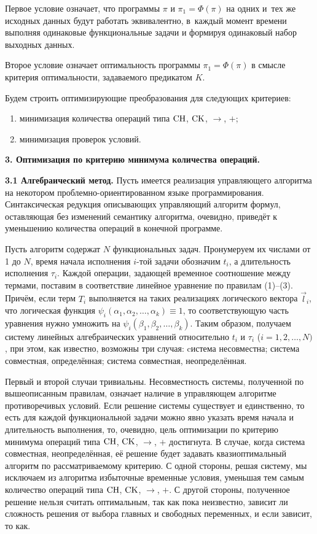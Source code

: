 Первое условие означает,  что программы $\pi $ и $\pi _1 =\Phi(\pi )$  на одних
и~тех же исходных данных будут работать эквивалентно,  в~каждый момент
времени выполняя одинаковые функциональные задачи и формируя одинаковый
набор выходных данных.

Второе условие означает оптимальность программы $\pi _1 =\Phi(\pi )$ в смысле
критерия оптимальности,  задаваемого предикатом $K$.

Будем строить оптимизирующие преобразования для следующих критериев:

\begin{enumerate}
\item минимизация количества операций типа ${\rm CH}$, ${\rm CK}$, $\to$, $+$;
\item минимизация проверок условий.
\end{enumerate}

\textbf{3. Оптимизация по критерию минимума количества операций.}

\textbf{3.1 Алгебраический метод.} Пусть имеется реализация управляющего
алгоритма на некотором проблемно-ориентированном языке программирования.
Синтаксическая редукция описывающих управляющий алгоритм формул,
оставляющая без изменений семантику алгоритма,  очевидно,  приведёт к
уменьшению количества операций в конечной программе.

Пусть алгоритм содержат $N$ функциональных задач.  Пронумеруем их числами от
1 до $N$,  время начала исполнения $i$-той задачи обозначим $t_i $,  а
длительность исполнения $\tau _i $. Каждой операции,  задающей временное
соотношение между термами,  поставим в соответствие линейное уравнение по
правилам (1)--(3).
Причём,  если терм $T_i $  выполняется на таких
реализациях логического вектора $\vec l_i $,  что логическая функция
$\psi _i (\alpha _1 , \alpha _2 , \dots, \alpha _k )\equiv 1$,  то соответствующую часть
уравнения нужно умножить на $\psi _i (\beta _1 , \beta _2 , \dots, \beta _k )$.
Таким образом,  получаем систему линейных алгебраических уравнений относительно
$t_i $ и $\tau _i $ ($i=1, 2, \dots, N)$,
при этом,  как известно,
возможны три случая: cистема несовместна; система совместная,  определённая;
система совместная,  неопределённая.

Первый и второй случаи тривиальны. Несовместность системы,  полученной по
вышеописанным правилам,  означает наличие в управляющем алгоритме
противоречивых условий.
Если решение системы существует и единственно,  то
есть для каждой функциональной задачи можно явно указать время начала и
длительность выполнения,  то,  очевидно,  цель оптимизации по критерию минимума
операций типа ${\rm CH}$, ${\rm CK}$, $\to$, $+$ достигнута.
В случае,  когда система
совместная,  неопределённая,  её решение будет задавать квазиоптимальный
алгоритм по рассматриваемому критерию.
С одной стороны,  решая систему,  мы
исключаем из алгоритма избыточные временные условия,  уменьшая тем самым
количество операций типа ${\rm CH}$, ${\rm CK}$, $\to$, $+$.
С другой стороны,  полученное
решение нельзя считать оптимальным,  так как пока неизвестно, зависит ли
сложность решения от выбора главных и свободных переменных,  и если зависит,
то как.

